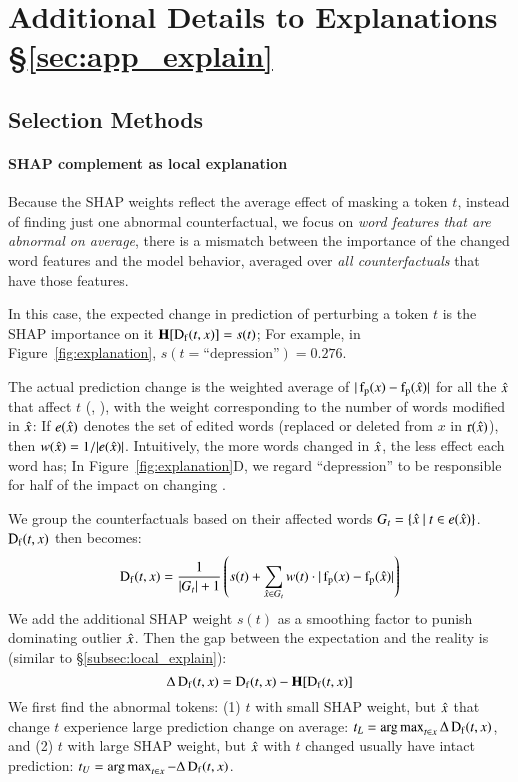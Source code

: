 \section{Additional Details to Explanations \S\ref{sec:app_explain}}
\label{appendix:explanation}


\subsection{Selection Methods}
\label{appendix:exp_rank}

\paragraph{SHAP complement as local explanation}
Because the SHAP weights reflect the average effect of masking a token $t$, instead of finding just one abnormal counterfactual, we focus on \emph{word features that are abnormal on average}, \ie there is a mismatch between the importance of the changed word features and the model behavior, averaged over \emph{all counterfactuals} that have those features.

In this case, the expected change in prediction of perturbing a token $t$ is the SHAP importance on it $\operatorname*{\mathbf{H}}[\operatorname*{D_f}(t, x)] = s(t)$; 
For example, in Figure~\ref{fig:explanation}, $s(t=\text{``depression''})=0.276$.

The actual prediction change is the weighted average of $|\operatorname*{f_p}(x)-\operatorname*{f_p}(\hat{x})|$ for all the $\hat{x}$ that affect $t$ (, ), with the weight corresponding to the number of words modified in $\hat{x}$: If $e(\hat{x})$ denotes the set of edited words (replaced or deleted from $x$ in $\operatorname*{r}(\hat{x})$), then $w(\hat{x}) = 1/|e(\hat{x})|$.
Intuitively, the more words changed in $\hat{x}$, the less effect each word has; In Figure~\ref{fig:explanation}D, we regard ``depression'' to be responsible for half of the impact on changing .

We group the counterfactuals based on their affected words $G_t = \{\hat{x}\ |\ t \in e(\hat{x})\}$. $\operatorname*{D_f}(t, x)$ then becomes:
$$\operatorname*{D_f}(t, x) = \frac{1}{|G_t|+1} \left(s(t) + \sum_{\hat{x} \in G_t} w(t)\cdot |\operatorname*{f_p}(x)-\operatorname*{f_p}(\hat{x})|\right)$$
We add the additional SHAP weight $s(t)$ as a smoothing factor to punish dominating outlier $\hat{x}$.
Then the gap between the expectation and the reality is (similar to \S\ref{subsec:local_explain}):
$$\Delta\operatorname*{D_f}(t, x) = \operatorname*{D_f}(t, x)-\operatorname*{\mathbf{H}}[\operatorname*{D_f}(t, x)]$$
We first find the abnormal tokens: (1) $t$ with small SHAP weight, but $\hat{x}$ that change $t$ experience large prediction change on average: $t_L = \operatorname*{arg\,max}_{t\in x} \Delta\operatorname*{D_f}(t, x)$, and (2) $t$ with large SHAP weight, but $\hat{x}$ with $t$ changed usually have intact prediction: $t_U = \operatorname*{arg\,max}_{t\in x} -\Delta\operatorname*{D_f}(t, x)$.

